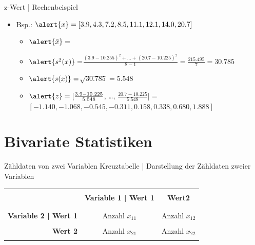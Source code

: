 \begin{frame}
  {z-Wert | Rechenbeispiel}
  \begin{itemize}[<+->]
    \item Bsp.: $\alert{x}=[3.9, 4.3, 7.2, 8.5, 11.1, 12.1, 14.0, 20.7]$
      \Halbzeile
      \begin{itemize}[<+->]
        \item $\alert{\bar{x}}=$
          \Halbzeile
        \item $\alert{s^2(x)}=$$\frac{(3.9-10.255)^2+\ldots+(20.7-10.225)^2}{8-1}=$$\frac{215.495}{7}=$$30.785$
          \Halbzeile
        \item $\alert{s(x)}=$$\sqrt{30.785}=$$5.548$
          \Halbzeile
        \item $\alert{z}=[\frac{3.9-10.225}{5.548}$, \ldots, $\frac{20.7-10.225}{5.548}]=$$[-1.140, -1.068, -0.545, -0.311, 0.158, 0.338, 0.680, 1.888]$
      \end{itemize}
  \end{itemize}
\end{frame}

\section{Bivariate Statistiken}

\begin{frame}
  {Zähldaten von zwei Variablen}
  \alert{Kreuztabelle} | Darstellung der Zähldaten zweier Variablen\\
  \Zeile
  \begin{center}
    \begin{tabular}{rcc}
      \cline{2-3}
      &&\\
      & \textbf{Variable 1 | Wert 1} & \textbf{Wert2} \\
      &&\\
      \hline
      &&\\
      \textbf{Variable 2 | Wert 1} & Anzahl $x_{11}$ & Anzahl $x_{12}$ \\
      &&\\
      \textbf{Wert 2} & Anzahl $x_{21}$ & Anzahl $x_{22}$ \\
      &&\\
      \hline
    \end{tabular}
  \end{center}
\end{frame}

